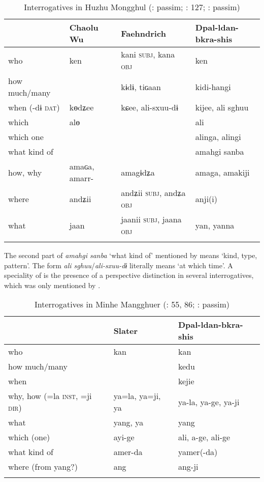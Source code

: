 \begin{table}
\caption{Interrogatives in Huzhu Mongghul (\citealt{Chaolu1994c}: passim; \citealt{Faehndrich2007}: 127; \citealt{Dpal-ldan-bkra-shis1996}: passim)}
\label{tab:mong:26}

\begin{tabularx}{\textwidth}{lllQ}
\lsptoprule
& \textbf{Chaolu Wu} & \textbf{Faehndrich} & \textbf{Dpal-ldan-bkra-shis}\\
\midrule
who & ken & kani \textsc{subj}, kana \textsc{obj} & ken\\
how much/many &  & kɨdɨ, tiɢaan & kidi-hangi\\
when (-dɨ \textsc{dat}) & kɵdʑee & kɕee, ali-sxuu-dɨ & kijee, ali sghuu\\
which & alɵ &  & ali\\
which one &  &  & alinga, alingi\\
what kind of &  &  & amahgi sanba\\
how, why & amaɢa, amarr- & amagɨdʑa & amaga, amakiji\\
where & andʑii & andʑii \textsc{subj}, andʑa \textsc{obj} & anji(i)\\
what & jaan & jaanii \textsc{subj},  jaana \textsc{obj} & yan, yanna\\
\lspbottomrule
\end{tabularx}
\end{table}

\clearpage %
The second part of \textit{amahgi sanba} ‘what kind of’ mentioned by \cite[232, 241]{Dpal-ldan-bkra-shis1996} means ‘kind, type, pattern’. The form \textit{ali sghuu}/\textit{ali-sxuu-dɨ} literally means ‘at which time’. A speciality of  is the presence of a perspective distinction in several interrogatives, which was only mentioned by \citet{Faehndrich2007}.

\begin{table}
\caption{Interrogatives in Minhe Mangghuer (\citealt{Slater2003a}: 55, 86; \citealt{Dpal-ldan-bkra-shis1996}: passim)}
\label{tab:mong:27}

\begin{tabularx}{\textwidth}{XXl}
\lsptoprule
& \textbf{Slater} & \textbf{Dpal-ldan-bkra-shis}\\
\midrule
who & kan & kan\\
how much/many &  & kedu\\
when &  & kejie\\
why, how (=la \textsc{inst}, =ji \textsc{dir}) & ya=la, ya=ji, ya & ya-la, ya-ge, ya-ji\\
what & yang, ya & yang\\
which (one) & ayi-ge & ali, a-ge, ali-ge\\
what kind of & amer-da & yamer(-da)\\
where (from yang?) & ang & ang-ji\\
\lspbottomrule
\end{tabularx}
\end{table}


